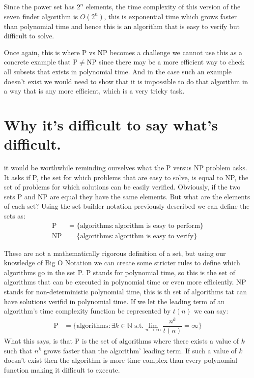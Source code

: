 \documentclass[twoside,10pt]{article}
\begin{document}
Since the power set has $2^n$ elements, the time complexity of this version of the seven finder algorithm is $O(2^n)$, this is exponential time which grows faster than polynomial time and hence this is an algorithm that is easy to verify but difficult to solve.

Once again, this is where P vs NP becomes a challenge we cannot use this as a concrete example that P$\neq$NP since there may be a more efficient way to check all subsets that exists in polynomial time. And in the case such an example doesn't exist we would need to show that it is impossible to do that algorithm in a way that is any more efficient, which is a very tricky task.

\section{Why it's difficult to say what's difficult.}

it would be worthwhile reminding ourselves what the P versus NP problem asks. It asks if P, the set for which problems that are easy to solve, is equal to NP, the set of problems for which solutions can be easily verified. Obviously, if the two sets P and NP are equal they have the same elements. But what are the elements of each set? Using the set builder notation previously described we can define the sets as:
\begin{align*}
    \text{P} &= \{\text{algorithms}:\text{algorithm is easy to perform}\}\\
    \text{NP} &= \{\text{algorithms}:\text{algorithm is easy to verify}\}
\end{align*}

These are not a mathematically rigorous definition of a set, but using our knowledge of Big O Notation we can create some stricter rules to define which algorithms go in the set P. P stands for polynomial time, so this is the set of algorithms that can be executed in polynomial time or even more efficiently. NP stands for non-deterministic polynomial time, this is th set of algorithms tat can have solutions verifid in polynomial time. If we let the leading term of an algorithm's time complexity function be represented by $t(n)$ we can say:
\begin{align*}
    \text{P} &= \{\text{algorithms}:\exists k\in\mathbb{N} \text{ s.t.}\lim_{n\to\infty}\dfrac{n^k}{t(n)}=\infty\}
\end{align*}
What this says, is that P is the set of algorithms where there exists a value of $k$ such that $n^k$ grows faster than the algorithm' leading term. If such a value of $k$ doesn't exist then the algorithm is more time complex than every polynomial function making it difficult to execute.
\end{document}
